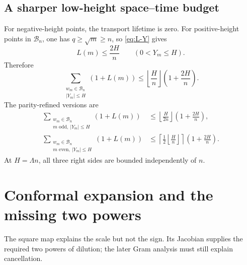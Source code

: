 \documentclass[11pt]{article}
\theoremstyle{definition}
\newcommand{\1}{\mathbf{1}}
\begin{document}
\subsection{A sharper low-height space--time budget}

For negative-height points, the transport lifetime is zero.  For positive-height points in $\mathscr B_n$, one has $q\ge\sqrt m\ge n$, so \cref{eq:L-Y} gives
\begin{equation}
 L(m)\le\frac{2H}{n}
 \qquad(0<Y_m\le H).
 \label{eq:L-H-n}
\end{equation}
Therefore
\begin{equation}
 \boxed{
 \sum_{\substack{w_m\in\mathscr B_n\\|Y_m|\le H}}
 (1+L(m))
 \le
 \left\lfloor\frac{H}{n}\right\rfloor
 \left(1+\frac{2H}{n}\right).
 }
 \label{eq:space-time-budget}
\end{equation}
The parity-refined versions are
\begin{align}
 \sum_{\substack{w_m\in\mathscr B_n\\m\text{ odd},\ |Y_m|\le H}}
 (1+L(m))
 &\le
 \left\lfloor\frac{H}{2n}\right\rfloor
 \left(1+\frac{2H}{n}\right),
 \label{eq:odd-space-time-budget}\\
 \sum_{\substack{w_m\in\mathscr B_n\\m\text{ even},\ |Y_m|\le H}}
 (1+L(m))
 &\le
 \left\lceil\frac{1}{2}
 \left\lfloor\frac{H}{n}\right\rfloor\right\rceil
 \left(1+\frac{2H}{n}\right).
 \label{eq:even-space-time-budget}
\end{align}
At $H=\Lambda n$, all three right sides are bounded independently of $n$.


\section{Conformal expansion and the missing two powers}
\label{sec:jacobian}

The square map explains the scale but not the sign.  Its Jacobian supplies the required two powers of dilution; the later Gram analysis must still explain cancellation.
\end{document}
